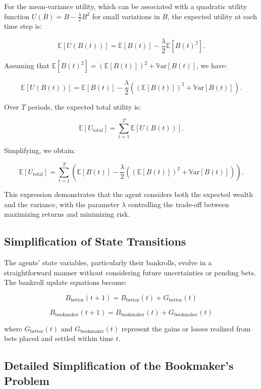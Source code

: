 For the mean-variance utility, which can be associated with a quadratic utility function \( U(B) = B - \frac{ \lambda }{ 2 } B^2 \) for small variations in \( B \), the expected utility at each time step is:

\[
\mathbb{E}[ U(B(t)) ] = \mathbb{E}[ B(t) ] - \frac{ \lambda }{ 2 } \mathbb{E}[ B(t)^2 ].
\]

Assuming that \( \mathbb{E}[ B(t)^2 ] = \left( \mathbb{E}[ B(t) ] \right)^2 + \mathbb{V}\mathrm{ar}[ B(t) ] \), we have:

\[
\mathbb{E}[ U(B(t)) ] = \mathbb{E}[ B(t) ] - \frac{ \lambda }{ 2 } \left( \left( \mathbb{E}[ B(t) ] \right)^2 + \mathbb{V}\mathrm{ar}[ B(t) ] \right).
\]

Over \( T \) periods, the expected total utility is:

\[
\mathbb{E}[ U_{\text{total}} ] = \sum_{t=1}^{T} \mathbb{E}[ U(B(t)) ].
\]

Simplifying, we obtain:

\[
\mathbb{E}[ U_{\text{total}} ] = \sum_{t=1}^{T} \left( \mathbb{E}[ B(t) ] - \frac{ \lambda }{ 2 } \left( \left( \mathbb{E}[ B(t) ] \right)^2 + \mathbb{V}\mathrm{ar}[ B(t) ] \right) \right).
\]

This expression demonstrates that the agent considers both the expected wealth and the variance, with the parameter \( \lambda \) controlling the trade-off between maximizing returns and minimizing risk.

\subsection{Simplification of State Transitions}

The agents' state variables, particularly their bankrolls, evolve in a straightforward manner without considering future uncertainties or pending bets. The bankroll update equations become:

\[
B_{\text{bettor}}(t+1) = B_{\text{bettor}}(t) + G_{\text{bettor}}(t)
\]

\[
B_{\text{bookmaker}}(t+1) = B_{\text{bookmaker}}(t) + G_{\text{bookmaker}}(t)
\]

where \( G_{\text{bettor}}(t) \) and \( G_{\text{bookmaker}}(t) \) represent the gains or losses realized from bets placed and settled within time \( t \).


\subsection{Detailed Simplification of the Bookmaker's Problem}

